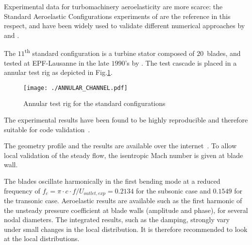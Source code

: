 
Experimental data for turbomachinery aeroelasticity are more scarce: 
the Standard Aeroelastic Configurations experiments 
of \citet{Fransson1999} are the 
reference in this respect, and have been widely used 
to validate different numerical approaches by \citet{Sbardella2001,
Duta2002,Campobasso2003} and \citet{Cinnella2004}. 

The $11$\textsuperscript{th} standard configuration is a
turbine stator composed of $20$~blades, and tested at EPF-Lausanne
in the late $1990$'s by \citet{Fransson1999}.
The test cascade is placed in a 
annular test rig as depicted in Fig.\ref{fig:annular_channel}.
\begin{figure}[htbp]
  \centering
  \texttt{[image: ./ANNULAR\_CHANNEL.pdf]}
  \caption{Annular test rig for the standard configurations}
  \label{fig:annular_channel}
\end{figure}
The experimental results have been found to be highly reproducible and
therefore suitable for code validation~\cite{Fransson1999}.  

The geometry profile and the results are available over the
internet~\cite{stcf11web}.  To allow local validation of the steady
flow, the isentropic Mach number is given at blade wall.

The blades oscillate harmonically in the first bending mode
at a reduced frequency of $f_{c} =\pi \cdot c \cdot
f/U_{outlet, exp} = 0.2134$ for the subsonic case and $0.1549$ for the
transonic case. Aeroelastic
results are available such as the first harmonic of the unsteady pressure
coefficient at blade walls (amplitude and phase), for several nodal
diameters. The integrated
results, such as the damping, strongly vary under small changes in the
local distribution. It is therefore recommended to look at the local
distributions.